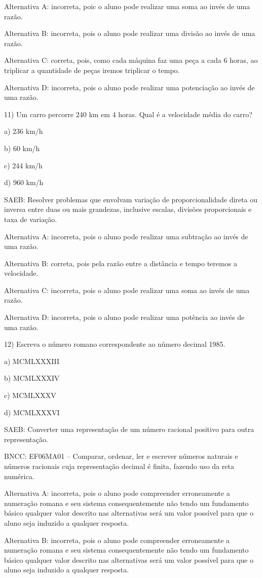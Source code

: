 Alternativa A: incorreta, poic o aluno pode realizar uma soma ao invés
de uma razão.

Alternativa B: incorreta, pois o aluno pode realizar uma divisão ao
invés de uma razão.

Alternativa C: correta, pois, como cada máquina faz uma peça a cada 6
horas, ao triplicar a quantidade de peças iremos triplicar o tempo.

Alternativa D: incorreta, pois o aluno pode realizar uma potenciação ao
invés de uma razão.

11) Um carro percorre 240 km em 4 horas. Qual é a velocidade média do
carro?

a) 236 km/h

b) 60 km/h

c) 244 km/h

d) 960 km/h

SAEB: Resolver problemas que envolvam variação de proporcionalidade
direta ou inversa entre duas ou mais grandezas, inclusive escalas,
divisões proporcionais e taxa de variação.

Alternativa A: incorreta, pois o aluno pode realizar uma subtração ao
invés de uma razão.

Alternativa B: correta, pois pela razão entre a distância e tempo
teremos a velocidade.

Alternativa C: incorreta, pois o aluno pode realizar uma soma ao invés
de uma razão.

Alternativa D: incorreta, pois o aluno pode realizar uma potência ao
invés de uma razão.

12) Escreva o número romano correspondente ao número decimal 1985.

a) MCMLXXXIII

b) MCMLXXXIV

c) MCMLXXXV

d) MCMLXXXVI

SAEB: Converter uma representação de um número racional positivo para
outra representação.

BNCC: EF06MA01 -- Comparar, ordenar, ler e escrever números naturais e
números racionais cuja representação decimal é finita, fazendo uso da
reta numérica.

Alternativa A: incorreta, pois o aluno pode compreender erroneamente a
numeração romana e seu sistema consequentemente não tendo um fundamento
básico qualquer valor descrito nas alternativas será um valor possível
para que o aluno seja induzido a qualquer resposta.

Alternativa B: incorreta, pois o aluno pode compreender erroneamente a
numeração romana e seu sistema consequentemente não tendo um fundamento
básico qualquer valor descrito nas alternativas será um valor possível
para que o aluno seja induzido a qualquer resposta.

